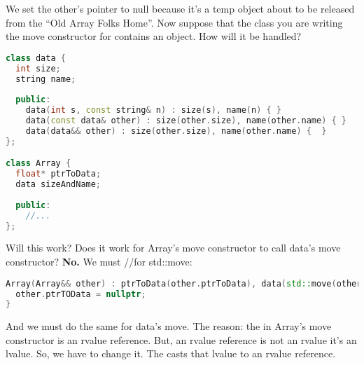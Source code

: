 We set the other's pointer to null because it's a temp object about to be released from the ``Old Array Folks Home''. Now suppose that the class you are writing the move constructor for contains an object. How will it be handled?

\begin{lstlisting}[language=C++]
class data {
  int size;
  string name;
  
  public:
    data(int s, const string& n) : size(s), name(n) { }
    data(const data& other) : size(other.size), name(other.name) { }
    data(data&& other) : size(other.size), name(other.name) {  }
};

class Array {
  float* ptrToData;
  data sizeAndName;
  
  public:
    //...
};
\end{lstlisting}

Will this work? Does it work for Array's move constructor to call data's move constructor? \textbf{No.} We must  //for std::move:

\begin{lstlisting}[language=C++]
Array(Array&& other) : ptrToData(other.ptrToData), data(std::move(other.data)) {
  other.ptrTOData = nullptr;
}
\end{lstlisting}

And we must do the same for data's move. The reason: the  in Array's move constructor is an rvalue reference. But, an rvalue reference is not an rvalue it's an lvalue. So, we have to change it. The  casts that lvalue to an rvalue reference.
